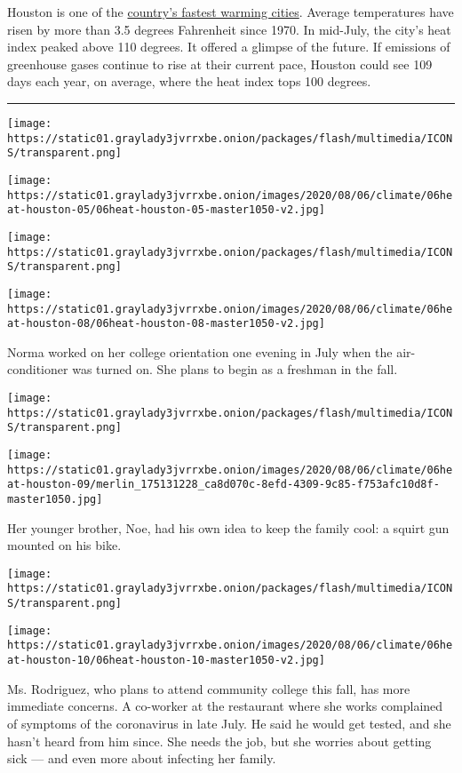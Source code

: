 Houston is one of the
\href{https://www.climatecentral.org/news/report-american-warming-us-heats-up-earth-da}{country's
fastest warming cities}. Average temperatures have risen by more than
3.5 degrees Fahrenheit since 1970. In mid-July, the city's heat index
peaked above 110 degrees. It offered a glimpse of the future. If
emissions of greenhouse gases continue to rise at their current pace,
Houston could see 109 days each year, on average, where the heat index
tops 100 degrees.

\begin{center}\rule{0.5\linewidth}{\linethickness}\end{center}

\texttt{[image: https://static01.graylady3jvrrxbe.onion/packages/flash/multimedia/ICONS/transparent.png]}

\texttt{[image: https://static01.graylady3jvrrxbe.onion/images/2020/08/06/climate/06heat-houston-05/06heat-houston-05-master1050-v2.jpg]}

\texttt{[image: https://static01.graylady3jvrrxbe.onion/packages/flash/multimedia/ICONS/transparent.png]}

\texttt{[image: https://static01.graylady3jvrrxbe.onion/images/2020/08/06/climate/06heat-houston-08/06heat-houston-08-master1050-v2.jpg]}

Norma worked on her college orientation one evening in July when the
air-conditioner was turned on. She plans to begin as a freshman in the
fall.

\texttt{[image: https://static01.graylady3jvrrxbe.onion/packages/flash/multimedia/ICONS/transparent.png]}

\texttt{[image: https://static01.graylady3jvrrxbe.onion/images/2020/08/06/climate/06heat-houston-09/merlin\_175131228\_ca8d070c-8efd-4309-9c85-f753afc10d8f-master1050.jpg]}

Her younger brother, Noe, had his own idea to keep the family cool: a
squirt gun mounted on his bike.

\texttt{[image: https://static01.graylady3jvrrxbe.onion/packages/flash/multimedia/ICONS/transparent.png]}

\texttt{[image: https://static01.graylady3jvrrxbe.onion/images/2020/08/06/climate/06heat-houston-10/06heat-houston-10-master1050-v2.jpg]}

Ms. Rodriguez, who plans to attend community college this fall, has more
immediate concerns. A co-worker at the restaurant where she works
complained of symptoms of the coronavirus in late July. He said he would
get tested, and she hasn't heard from him since. She needs the job, but
she worries about getting sick --- and even more about infecting her
family.

